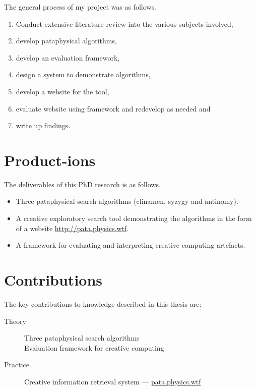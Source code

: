 The general process of my project was as follows.

\begin{enumerate}
  \item Conduct extensive literature review into the various subjects involved,
  \item develop pataphysical algorithms,
  \item develop an evaluation framework,
  \item design a system to demonstrate algorithms,
  \item develop a website for the tool,
  \item evaluate website using framework and redevelop as needed and
  \item write up findings.
\end{enumerate}


\section{Product-ions}

The deliverables of this PhD research is as follows.

\begin{itemize}
  \item Three pataphysical search algorithms (clinamen, syzygy and antinomy).
  \item A creative exploratory search tool demonstrating the algorithms in the form of a website \url{http://pata.physics.wtf}.
  \item A framework for evaluating and interpreting creative computing artefacts.
\end{itemize}


\section{Contributions}

The key contributions to knowledge described in this thesis are:

\begin{description}
  \item [Theory] Three pataphysical search algorithms\\
                   Evaluation framework for creative computing
  \item [Practice] Creative information retrieval system --- \url{pata.physics.wtf}
\end{description}

